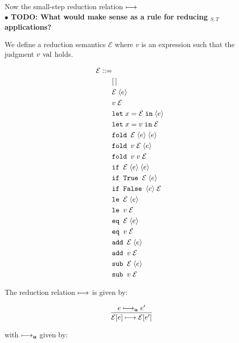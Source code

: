 \documentclass[10pt]{article}
\begin{document}
\noindent
Now the small-step reduction relation $\longmapsto$\\

\textbf{$\bullet$ TODO: What would make sense as a rule for reducing $_{S,T}$ applications?}

We define a reduction semantics $\mathcal{E}$ where $v$ is an expression such that the judgment $v \textnormal{ val}$ holds.

{\footnotesize
\begin{align*}
  \mathcal{E} ::=\\
    &[\,]\\
    &\mathcal{E}\; \langle e \rangle\\
    &v\; \mathcal{E}\\
    &\texttt{let}\; x = \mathcal{E}\; \texttt{in}\; \langle e \rangle\\
    &\texttt{let}\; x = v\; \texttt{in}\; \mathcal{E}\\
    &\texttt{fold } \mathcal{E}\; \langle e \rangle\; \langle e \rangle\\
    &\texttt{fold } v\; \mathcal{E}\; \langle e \rangle\\
    &\texttt{fold } v\; v\; \mathcal{E}\\
    &\texttt{if } \mathcal{E}\; \langle e \rangle\; \langle e \rangle\\
    &\texttt{if True } \mathcal{E}\; \langle e \rangle\\
    &\texttt{if False } \langle e \rangle\; \mathcal{E}\\
    &\texttt{le } \mathcal{E}\; \langle e \rangle\\
    &\texttt{le } v\; \mathcal{E}\\
    &\texttt{eq } \mathcal{E}\; \langle e \rangle\\
    &\texttt{eq } v\; \mathcal{E}\\
    &\texttt{add } \mathcal{E}\; \langle e \rangle\\
    &\texttt{add } v\; \mathcal{E}\\
    &\texttt{sub } \mathcal{E}\; \langle e \rangle\\
    &\texttt{sub } v\; \mathcal{E}\\
\end{align*}
}

The reduction relation $\longmapsto$ is given by:

\[
  \begin{array}{c}
    \labinfer{\mathcal{E}[e] \reduces \mathcal{E}[e']}{e \reducesA e'}
  \end{array}
\]

with $\longmapsto_{\boldsymbol{a}}$ given by:
\end{document}
